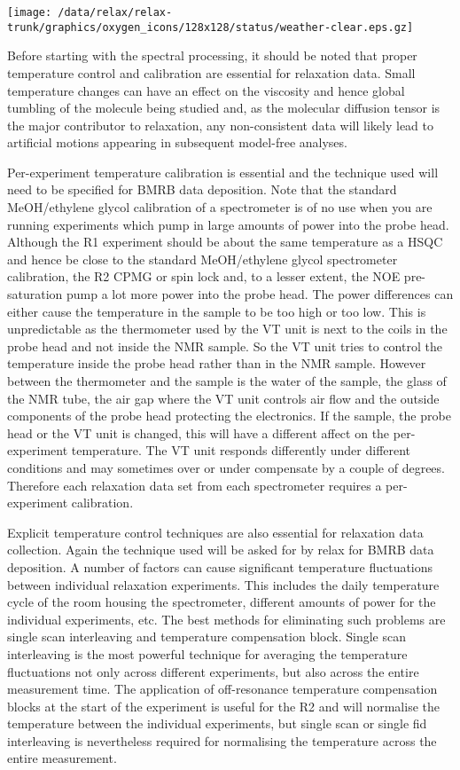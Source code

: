 \texttt{[image: /data/relax/relax-trunk/graphics/oxygen\_icons/128x128/status/weather-clear.eps.gz]}

Before starting with the spectral processing, it should be noted that proper temperature control and calibration are essential for relaxation data.  Small temperature changes can have an effect on the viscosity and hence global tumbling of the molecule being studied and, as the molecular diffusion tensor is the major contributor to relaxation, any non-consistent data will likely lead to artificial motions appearing in subsequent model-free analyses.

Per-experiment temperature calibration is essential and the technique used will need to be specified for BMRB data deposition.  Note that the standard MeOH/ethylene glycol calibration of a spectrometer is of no use when you are running experiments which pump in large amounts of power into the probe head.  Although the R1 experiment should be about the same temperature as a HSQC and hence be close to the standard MeOH/ethylene glycol spectrometer calibration, the R2 CPMG or spin lock and, to a lesser extent, the NOE pre-saturation pump a lot more power into the probe head.  The power differences can either cause the temperature in the sample to be too high or too low.  This is unpredictable as the thermometer used by the VT unit is next to the coils in the probe head and not inside the NMR sample.  So the VT unit tries to control the temperature inside the probe head rather than in the NMR sample.  However between the thermometer and the sample is the water of the sample, the glass of the NMR tube, the air gap where the VT unit controls air flow and the outside components of the probe head protecting the electronics.  If the sample, the probe head or the VT unit is changed, this will have a different affect on the per-experiment temperature.  The VT unit responds differently under different conditions and may sometimes over or under compensate by a couple of degrees.  Therefore each relaxation data set from each spectrometer requires a per-experiment calibration.

Explicit temperature control techniques are also essential for relaxation data collection.  Again the technique used will be asked for by relax for BMRB data deposition.  A number of factors can cause significant temperature fluctuations between individual relaxation experiments.  This includes the daily temperature cycle of the room housing the spectrometer, different amounts of power for the individual experiments, etc.  The best methods for eliminating such problems are single scan interleaving and temperature compensation block.  Single scan interleaving is the most powerful technique for averaging the temperature fluctuations not only across different experiments, but also across the entire measurement time.  The application of off-resonance temperature compensation blocks at the start of the experiment is useful for the R2 and will normalise the temperature between the individual experiments, but single scan or single fid interleaving is nevertheless required for normalising the temperature across the entire measurement.


